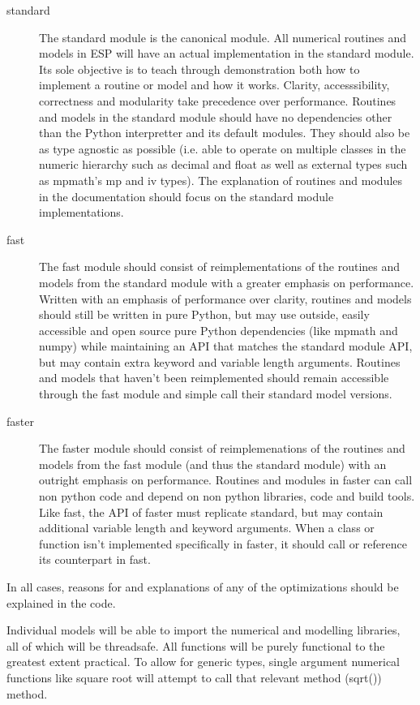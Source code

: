 \documentclass{article}
\begin{document}
\begin{description}
	\item[standard] The standard module is the canonical module. All numerical routines and models in ESP will have an actual implementation in the standard module. Its sole objective is to teach through demonstration both how to implement a routine or model and how it works. Clarity, accesssibility, correctness and modularity take precedence over performance. Routines and models in the standard module should have no dependencies other than the Python interpretter and its default modules.  They should also be as type agnostic as possible (i.e. able to operate on multiple classes in the numeric hierarchy such as decimal and float as well as external types such as mpmath's mp and iv types). The explanation of routines and modules in the documentation should focus on the standard module implementations.
	\item[fast] The fast module should consist of reimplementations of the routines and models from the standard module with a greater emphasis on performance. Written with an emphasis of performance over clarity, routines and models should still be written in pure Python, but may use outside, easily accessible and open source pure Python dependencies (like mpmath and numpy) while maintaining an API that matches the standard module API, but may contain extra keyword and variable length arguments. Routines and models that haven't been reimplemented should remain accessible through the fast module and simple call their standard model versions. 
	\item[faster] The faster module should consist of reimplemenations of the routines and models from the fast module (and thus the standard module) with an outright emphasis on performance. Routines and modules in faster can call non python code and depend on non python libraries, code and build tools. Like fast, the API of faster must replicate standard, but may contain additional variable length and keyword arguments. When a class or function isn't implemented specifically in faster, it should call or reference its counterpart in fast.
\end{description}
In all cases, reasons for and explanations of any of the optimizations should be explained in the code.

Individual models will be able to import the numerical and modelling libraries, all of which will be threadsafe. All functions will be purely functional to the greatest extent practical. To allow for generic types, single argument numerical functions like square root will attempt to call that relevant method (sqrt()) method.
\end{document}
